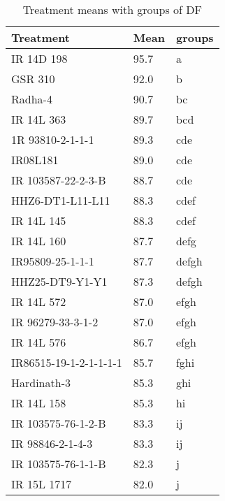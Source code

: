\documentclass[]{article}
\begin{document}
\begin{longtable}{lll}
\caption{\label{tab:two-fac-groups-tab2}Treatment means with groups of DF}\\
\toprule
Treatment & Mean & groups\\
\midrule
\rowcolor{gray!6}  IR 14D 198 & 95.7 & a\\
GSR 310 & 92.0 & b\\
\rowcolor{gray!6}  Radha-4 & 90.7 & bc\\
IR 14L 363 & 89.7 & bcd\\
\rowcolor{gray!6}  1R 93810-2-1-1-1 & 89.3 & cde\\
\addlinespace
IR08L181 & 89.0 & cde\\
\rowcolor{gray!6}  IR 103587-22-2-3-B & 88.7 & cde\\
HHZ6-DT1-L11-L11 & 88.3 & cdef\\
\rowcolor{gray!6}  IR 14L 145 & 88.3 & cdef\\
IR 14L 160 & 87.7 & defg\\
\addlinespace
\rowcolor{gray!6}  IR95809-25-1-1-1 & 87.7 & defgh\\
HHZ25-DT9-Y1-Y1 & 87.3 & defgh\\
\rowcolor{gray!6}  IR 14L 572 & 87.0 & efgh\\
IR 96279-33-3-1-2 & 87.0 & efgh\\
\rowcolor{gray!6}  IR 14L 576 & 86.7 & efgh\\
\addlinespace
IR86515-19-1-2-1-1-1-1 & 85.7 & fghi\\
\rowcolor{gray!6}  Hardinath-3 & 85.3 & ghi\\
IR 14L 158 & 85.3 & hi\\
\rowcolor{gray!6}  IR 103575-76-1-2-B & 83.3 & ij\\
IR 98846-2-1-4-3 & 83.3 & ij\\
\addlinespace
\rowcolor{gray!6}  IR 103575-76-1-1-B & 82.3 & j\\
IR 15L 1717 & 82.0 & j\\
\bottomrule
\end{longtable}

\endgroup{}
\begingroup\fontsize{12}{14}\selectfont
\end{document}
